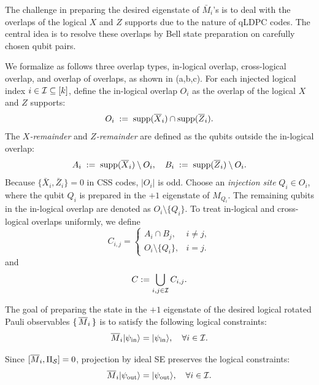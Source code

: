 The challenge in preparing the desired eigenstate of $ \bar M_i $'s is to deal with the overlaps of the logical $ X $ and $ Z $ supports due to the nature of qLDPC codes.
The central idea is to resolve these overlaps by Bell state preparation on carefully chosen qubit pairs.

We formalize as follows three overlap types, in-logical overlap, cross-logical overlap, and overlap of overlaps, as shown in (a,b,c).
For each injected logical index $i\in\mathcal{I}\subseteq [k]$, define the in-logical overlap $O_i$
as the overlap of the logical $ X $ and $ Z $ supports:
\begin{equation}
O_i \;:=\; \mathrm{supp}(\overline{X}_i)\cap\mathrm{supp}(\overline{Z}_i).
\end{equation}
The \emph{$X$-remainder} and \emph{$Z$-remainder} are defined as the qubits outside the in-logical overlap:
\begin{equation}
A_i \;:=\; \mathrm{supp}(\overline{X}_i)\setminus O_i, \quad
B_i \;:=\; \mathrm{supp}(\overline{Z}_i)\setminus O_i.
\end{equation}
Because $\{\bar X_i,\bar Z_i\}=0$ in CSS codes, $|O_i|$ is odd.
Choose an \emph{injection site} $Q_i\in O_i$, where the qubit $Q_i$ is prepared in the $+1$ eigenstate of $M_{Q_i}$. The remaining qubits in the in-logical overlap are denoted as $O_i\setminus\{Q_i\}$.
To treat in-logical and cross-logical overlaps uniformly, we define
\begin{equation}
    C_{i,j} =
    \begin{cases}
        A_i\cap B_j, & i\neq j,\\
        O_i\setminus\{Q_i\}, & i=j.
    \end{cases}
    \label{eq:unified-Cij}
\end{equation}
and
\begin{equation}
C := \bigcup_{i,j\in\mathcal{I}} C_{i,j}.
\end{equation}

The goal of preparing
the state in the $+1$ eigenstate of the desired logical rotated Pauli observables $ \set{\overline{M}_i} $ is to satisfy the following logical constraints:
\begin{equation}
\overline{M}_i|\psi_{\mathrm{in}}\rangle = |\psi_{\mathrm{in}}\rangle,\quad \forall i\in\mathcal{I}.
\label{eq:goal-pre-se-state}
\end{equation}

Since $[\overline{M}_i,\Pi_{\mathcal S}]=0$, projection by ideal SE preserves the logical constraints:
\begin{equation}
\overline{M}_i|\psi_{\mathrm{out}}\rangle = |\psi_{\mathrm{out}}\rangle,\quad \forall i\in\mathcal{I}.
\end{equation}


